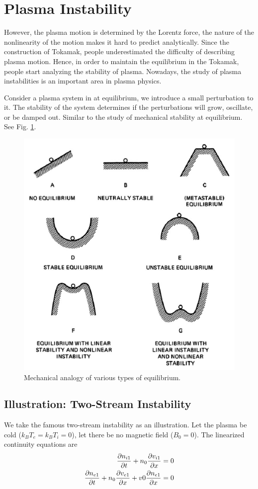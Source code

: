 \section{Plasma Instability}
However, the plasma motion is determined by the Lorentz force, the nature of the nonlinearity of the motion makes it hard to predict analytically. Since the construction of Tokamak, people underestimated the difficulty of describing plasma motion. Hence, in order to maintain the equilibrium in the Tokamak, people start analyzing the stability of plasma. Nowadays, the study of plasma instabilities is an important area in plasma physics. 

Consider a plasma system in at equilibrium, we introduce a small perturbation to it. The stability of the system determines if the perturbations will grow, oscillate, or be damped out. Similar to the study of mechanical stability at equilibrium. See Fig. \ref{fig:stability-visualization}.

\begin{figure}[H]
	\centering
	\includegraphics[width=0.7\linewidth]{img/introduction/stability_visualization}
	\caption{Mechanical analogy of various types of equilibrium. \cite{chen_introduction_2016}}
	\label{fig:stability-visualization}
\end{figure}


\subsection{Illustration: Two-Stream Instability}
We take the famous two-stream instability as an illustration. Let the plasma be cold ($k_BT_e = k_BT_i = 0$), let there be no magnetic field ($B_0=0$). The linearized continuity equations are
\begin{align} 
	\pdv{n_{i1}}{t} + n_0\pdv{v_{i1}}{x} &= 0  \label{eq:two-stream-continuity1} \\
	\pdv{n_{e1}}{t} + n_0\pdv{v_{e1}}{x} + v0\pdv{n_{e1}}{x} &= 0 \label{eq:two-stream-continuity2}
\end{align}

